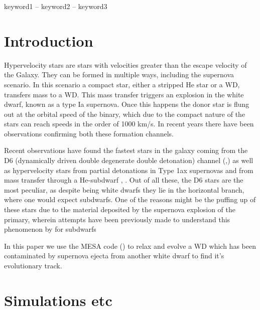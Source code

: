 \documentclass[fleqn,usenatbib]{mnras}
\begin{document}
\begin{keywords}
keyword1 -- keyword2 -- keyword3
\end{keywords}



\section{Introduction}

Hypervelocity stars are stars with velocities greater than the escape velocity of the Galaxy. They can be formed in multiple ways, including the supernova scenario. In this scenario a compact star, either a stripped He star or a WD, transfers mass to a WD. This mass transfer triggers an explosion in the white dwarf, known as a type Ia supernova. Once this happens the donor star is flung out at the orbital speed of the binary, which due to the compact nature of the stars can reach speeds in the order of 1000 km/s. In recent years there have been observations confirming both these formation channels. 

Recent observations have found the fastest stars in the galaxy coming from the D6 (dynamically driven double degenerate double detonation) channel (\cite{2018ApJ...865...15S},\cite{2023arXiv230603914E}) as well as hypervelocity stars from partial detonations in Type 1ax supernovas \cite{2019MNRAS.489.1489R} and from mass transfer through a He-subdwarf \cite{2005A&A...444L..61H}, \cite{2015Sci...347.1126G}. Out of all these, the D6 stars are the most peculiar, as despite being white dwarfs they lie in the horizontal branch, where one would expect subdwarfs. One of the reasons might be the puffing up of these stars due to the material deposited by the supernova explosion of the primary, wherein attempts have been previously made to understand this phenomenon by \cite{2019ApJ...887...68B} for subdwarfs

In this paper we use the MESA code (\cite{2011ApJS..192....3P}) to relax and evolve a WD which has been contaminated by supernova ejecta from another white dwarf to find it's evolutionary track. 

\section{Simulations etc}
\end{document}
